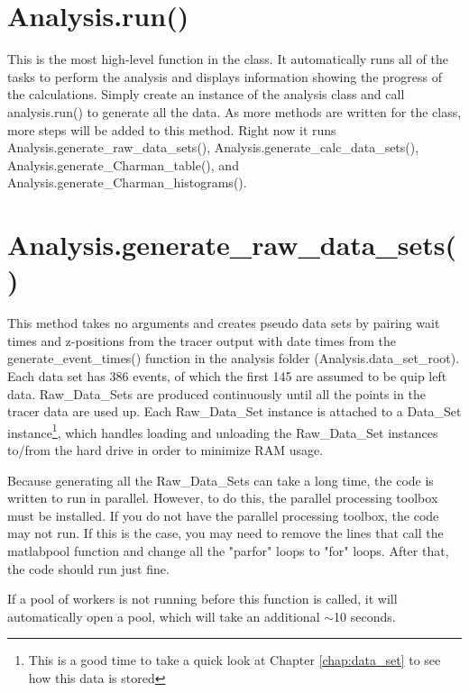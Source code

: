 \documentclass[12pt]{report}
\begin{document}
\section{Analysis.run()}
This is the most high-level function in the class.  It automatically runs all of the tasks to perform the analysis and displays information showing the progress of the calculations.  Simply create an instance of the analysis class and call analysis.run() to generate all the data.  As more methods are written for the class, more steps will be added to this method.  Right now it runs Analysis.generate\_raw\_data\_sets(), Analysis.generate\_calc\_data\_sets(), Analysis.generate\_Charman\_table(), and Analysis.generate\_Charman\_histograms().

\section{Analysis.generate\_raw\_data\_sets()}
This method takes no arguments and creates pseudo data sets by pairing wait times and z-positions from the tracer output with date times from the generate\_event\_times() function in the analysis folder (Analysis.data\_set\_root).  Each data set has 386 events, of which the first 145 are assumed to be quip left data.  Raw\_Data\_Sets are produced continuously until all the points in the tracer data are used up.  Each Raw\_Data\_Set instance is attached to a Data\_Set instance\footnote{This is a good time to take a quick look at Chapter \ref{chap:data_set} to see how this data is stored}, which handles loading and unloading the Raw\_Data\_Set instances to/from the hard drive in order to minimize RAM usage.

Because generating all the Raw\_Data\_Sets can take a long time, the code is written to run in parallel.  However, to do this, the parallel processing toolbox must be installed.  If you do not have the parallel processing toolbox, the code may not run.  If this is the case, you may need to remove the lines that call the matlabpool function and change all the "parfor" loops to "for" loops.  After that, the code should run just fine.

If a pool of workers is not running before this function is called, it will automatically open a pool, which will take an additional ${\sim}$10 seconds.%
\end{document}
